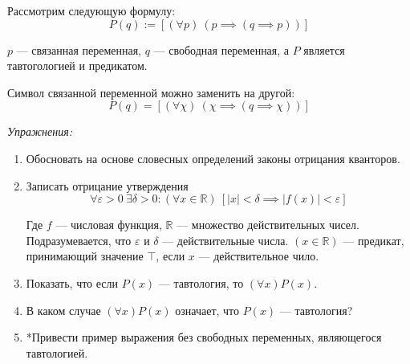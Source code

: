 Рассмотрим следующую формулу:
\[
	P(q):=[(\forall p)~(p\implies (q\implies p))]
\]

$p$ --- связанная переменная, $q$ --- свободная переменная, а
$P$ является тавтогологией и предикатом.

Символ связанной переменной можно заменить на другой:
\[
	P(q)=[(\forall \chi)~(\chi\implies (q\implies \chi))]
\]

{\it Упражнения:}
\begin{enumerate}
	\item{}Обосновать на основе словесных определений законы отрицания
	кванторов\label{ex:quantor_neg_def}.
	\item{}Записать отрицание утверждения
	\[
		\forall \varepsilon>0~\exists \delta>0:
		(\forall x\in\mathbb{R})~[|x|<\delta\implies |f(x)|<\varepsilon]
	\]

	Где $f$ --- числовая функция, $\mathbb{R}$ --- множество действительных чисел.
	Подразумевается, что $\varepsilon$ и $\delta$ --- действительные числа.
	${(x\in\mathbb{R})}$ --- предикат, принимающий значение $\top$,
	если $x$ --- действительное чило.

	\item{}Показать, что если $P(x)$ --- тавтология, то $(\forall x)P(x)$.

	\item{}В каком случае $(\forall x)P(x)$ означает, что $P(x)$ --- тавтология?

	\item{}*Привести пример выражения без свободных переменных,
	являющегося тавтологией.
\end{enumerate}
